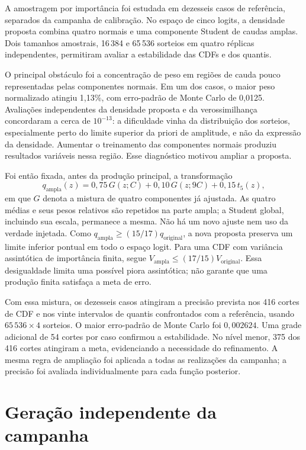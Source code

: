 A amostragem por importância foi estudada em dezesseis casos de
referência, separados da campanha de calibração. No espaço de cinco
logits, a densidade proposta combina quatro normais e uma componente
Student de caudas amplas. Dois tamanhos amostrais, 16\,384 e 65\,536
sorteios em quatro réplicas independentes, permitiram avaliar a
estabilidade das CDFs e dos quantis.

O principal obstáculo foi a concentração de peso em regiões de cauda
pouco representadas pelas componentes normais. Em um dos casos, o
maior peso normalizado atingiu 1,13\%, com erro-padrão de Monte Carlo
de 0,0125. Avaliações independentes da densidade proposta e da
verossimilhança concordaram a cerca de $10^{-13}$: a dificuldade
vinha da distribuição dos sorteios, especialmente perto do limite
superior da priori de amplitude, e não da expressão da densidade.
Aumentar o treinamento das componentes normais produziu resultados
variáveis nessa região. Esse diagnóstico motivou ampliar a proposta.

Foi então fixada, antes da produção principal, a transformação
\begin{equation}
 q_{\mathrm{ampla}}(z)=0{,}75\,G(z;C)
       +0{,}10\,G(z;9C)+0{,}15\,t_5(z),
 \label{eq:proposta-ampla}
\end{equation}
em que \(G\) denota a mistura de quatro componentes já ajustada.
As quatro médias e seus pesos relativos são repetidos na parte ampla;
a Student global, incluindo sua escala, permanece a mesma. Não há um
novo ajuste nem uso da verdade injetada. Como
\(q_{\mathrm{ampla}}\geq(15/17)q_{\mathrm{original}}\), a nova proposta
preserva um limite inferior pontual em todo o espaço logit. Para uma CDF
com variância assintótica de importância finita, segue
\(V_{\mathrm{ampla}}\leq(17/15)V_{\mathrm{original}}\).
Essa desigualdade limita uma possível piora assintótica; não garante
que uma produção finita satisfaça a meta de erro.

Com essa mistura, os dezesseis casos atingiram a precisão prevista
nos 416 cortes de CDF e nos vinte intervalos de quantis confrontados
com a referência, usando $65\,536\times4$ sorteios. O maior erro-padrão
de Monte Carlo foi $0{,}002624$. Uma grade adicional de 54 cortes por
caso confirmou a estabilidade. No nível menor, 375 dos 416 cortes
atingiram a meta, evidenciando a necessidade do refinamento. A mesma
regra de ampliação foi aplicada a todas as realizações da campanha;
a precisão foi avaliada individualmente para cada função posterior.

\section{Geração independente da campanha}

